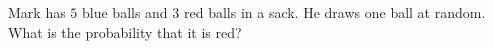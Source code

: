 Mark has $5$ blue balls and $3$ red balls in a sack. He draws one ball at random. What is the probability that it is red?
